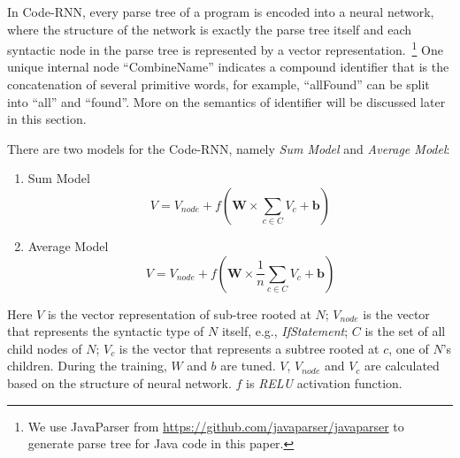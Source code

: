 In Code-RNN, every parse tree of a program is encoded into a neural network,
where the structure of the network is exactly the parse tree itself and
each syntactic node in the
parse tree is represented by a vector representation.~\footnote{We use
JavaParser from \url{https://github.com/javaparser/javaparser} to
generate parse tree for Java code in this paper.}
One unique internal node ``CombineName'' indicates a compound identifier that is
the concatenation of several primitive words, for example, ``allFound'' can be split into
``all'' and ``found''. More on the semantics of identifier will be discussed later in
this section.


There are two models for the Code-RNN, namely \emph{Sum Model} and \emph{Average Model}:
\begin{enumerate}
\item{Sum Model}
\begin{equation}\label{eq:code_rnn_sum}
V = V_{node} + f(\textbf{W} \times \sum_{c \in C}{ V_{c}} + \textbf{b})
\end{equation}

\item{Average Model}
\begin{equation}\label{eq:code_rnn_average}
V = V_{node} + f(\textbf{W} \times \frac{1}{n}\sum_{c \in C}{V_{c}} + \textbf{b})
\end{equation}
\end{enumerate}
Here $V$ is the vector representation of sub-tree rooted at $N$;
$V_{node}$ is the vector that represents the syntactic type of $N$ itself, e.g.,
{\em IfStatement};
$C$ is the set of all child nodes of $N$; $V_{c}$ is the vector that represents
a subtree rooted at $c$, one of $N$'s children.
During the training, $W$ and $b$ are tuned.
$V$, $V_{node}$ and $V_{c}$ are calculated based on the structure
of neural network. $f$ is \emph{RELU} activation function.


